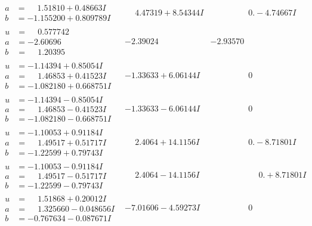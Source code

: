 \documentclass[1p]{elsarticle_modified}
\theoremstyle{definition}
\begin{document}
$$\begin{array}{c|c|c}
\begin{aligned}
a &= \phantom{-}1.51810 + 0.48663 I \\
b &= -1.155200 + 0.809789 I\end{aligned}
 & \phantom{-}4.47319 + 8.54344 I & \phantom{-0.000000 } 0. - 4.74667 I \\ \hline\begin{aligned}
u &= \phantom{-}0.577742\phantom{ +0.000000I} \\
a &= -2.60696\phantom{ +0.000000I} \\
b &= \phantom{-}1.20395\phantom{ +0.000000I}\end{aligned}
 & -2.39024\phantom{ +0.000000I} & -2.93570\phantom{ +0.000000I} \\ \hline\begin{aligned}
u &= -1.14394 + 0.85054 I \\
a &= \phantom{-}1.46853 + 0.41523 I \\
b &= -1.082180 + 0.668751 I\end{aligned}
 & -1.33633 + 6.06144 I & \phantom{-0.000000 } 0 \\ \hline\begin{aligned}
u &= -1.14394 - 0.85054 I \\
a &= \phantom{-}1.46853 - 0.41523 I \\
b &= -1.082180 - 0.668751 I\end{aligned}
 & -1.33633 - 6.06144 I & \phantom{-0.000000 } 0 \\ \hline\begin{aligned}
u &= -1.10053 + 0.91184 I \\
a &= \phantom{-}1.49517 + 0.51717 I \\
b &= -1.22599 + 0.79743 I\end{aligned}
 & \phantom{-}2.4064 + 14.1156 I & \phantom{-0.000000 } 0. - 8.71801 I \\ \hline\begin{aligned}
u &= -1.10053 - 0.91184 I \\
a &= \phantom{-}1.49517 - 0.51717 I \\
b &= -1.22599 - 0.79743 I\end{aligned}
 & \phantom{-}2.4064 - 14.1156 I & \phantom{-0.000000 -}0. + 8.71801 I \\ \hline\begin{aligned}
u &= \phantom{-}1.51868 + 0.20012 I \\
a &= \phantom{-}1.325660 - 0.048656 I \\
b &= -0.767634 - 0.087671 I\end{aligned}
 & -7.01606 - 4.59273 I & \phantom{-0.000000 } 0 \\ \hline\begin{aligned}

\end{aligned}
\end{array}$$
\end{document}

